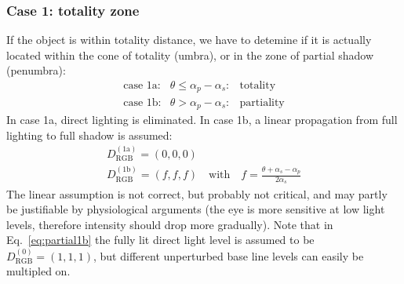 \documentclass[a4paper]{article}
\begin{document}
\subsubsection{Case 1: totality zone}
If the object is within totality distance, we have to detemine if it is actually located within the cone of totality (umbra), or in the zone of partial shadow (penumbra):
\begin{equation}
\begin{array}{lcl}
\text{case 1a:} & \theta \leq \alpha_p-\alpha_s: & \text{totality}\\
\text{case 1b:} & \theta > \alpha_p-\alpha_s: & \text{partiality}
\end{array}
\end{equation}
In case 1a, direct lighting is eliminated. In case 1b, a linear propagation from full lighting to full shadow is assumed:
\begin{equation}\label{eq:partial1b}
\begin{array}{l}
D_\text{RGB}^{(\text{1a})} = (0,0,0)\\
D_\text{RGB}^{(\text{1b})} = (f,f,f) \quad\text{with}\quad f = \frac{\theta+\alpha_s-\alpha_p}{2 \alpha_s}
\end{array}
\end{equation}
The linear assumption is not correct, but probably not critical, and may partly be justifiable by physiological arguments (the eye is more sensitive at low light levels, therefore intensity should drop more gradually).
Note that in Eq.~\ref{eq:partial1b} the fully lit direct light level is assumed to be $D_\text{RGB}^{(0)} = (1,1,1)$, but different unperturbed base line levels can easily be multipled on.
\end{document}
